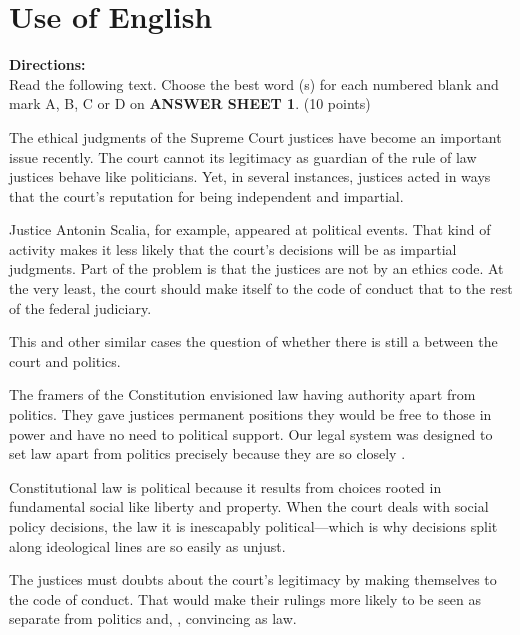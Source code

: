 



\section{Use of English}

\noindent
\textbf{Directions:}\\
Read the following text. Choose the best word (s) for each
	numbered blank and mark A, B, C or D on \textbf{ANSWER SHEET 1}.  (10 points)



\TiGanSpace


The ethical judgments of the Supreme Court justices have become an
important issue recently. The court cannot \cloze its
legitimacy as guardian of the rule of law \cloze justices
behave like politicians. Yet, in several instances, justices acted in
ways that \cloze the court's reputation for being independent
and impartial.

Justice Antonin Scalia, for example, appeared at political events. That
kind of activity makes it less likely that the court's decisions will
be \cloze as impartial judgments. Part of the problem is that
the justices are not \cloze by an ethics code. At the very
least, the court should make itself \cloze to the code of
conduct that \cloze to the rest of the federal judiciary.

This and other similar cases \cloze the question of whether
there is still a \cloze between the court and politics.

The framers of the Constitution envisioned law \cloze having
authority apart from politics. They gave justices permanent positions
\cloze they would be free to \cloze those in power
and have no need to \cloze political support. Our legal system
was designed to set law apart from politics precisely because they are
so closely \cloze.

Constitutional law is political because it results from choices rooted
in fundamental social \cloze like liberty and property. When
the court deals with social policy decisions, the law it \cloze
is inescapably political---which is why decisions split along
ideological lines are so easily \cloze as unjust.

The justices must \cloze doubts about the court's legitimacy
by making themselves \cloze to the code of conduct. That would
make their rulings more likely to be seen as separate from politics and,
\cloze , convincing as law.


